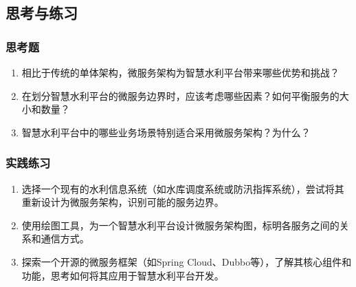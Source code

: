 \subsection{思考与练习}\label{ux601dux8003ux4e0eux7ec3ux4e60}

\subsubsection{思考题}\label{ux601dux8003ux9898}

\begin{enumerate}
\def\labelenumi{\arabic{enumi}.}
\tightlist
\item
  相比于传统的单体架构，微服务架构为智慧水利平台带来哪些优势和挑战？
\item
  在划分智慧水利平台的微服务边界时，应该考虑哪些因素？如何平衡服务的大小和数量？
\item
  智慧水利平台中的哪些业务场景特别适合采用微服务架构？为什么？
\end{enumerate}

\subsubsection{实践练习}\label{ux5b9eux8df5ux7ec3ux4e60}

\begin{enumerate}
\def\labelenumi{\arabic{enumi}.}
\tightlist
\item
  选择一个现有的水利信息系统（如水库调度系统或防汛指挥系统），尝试将其重新设计为微服务架构，识别可能的服务边界。
\item
  使用绘图工具，为一个智慧水利平台设计微服务架构图，标明各服务之间的关系和通信方式。
\item
  探索一个开源的微服务框架（如Spring
  Cloud、Dubbo等），了解其核心组件和功能，思考如何将其应用于智慧水利平台开发。
\end{enumerate}

